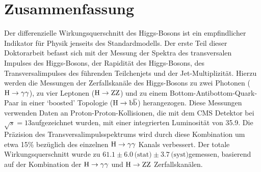 \section*{Zusammenfassung}


% 
Der differenzielle Wirkungsquerschnitt des Higgs-Bosons ist ein 
empfindlicher Indikator f{\"u}r Physik jenseits des Standardmodells.
% 
% 
% 
Der erste Teil dieser Doktorarbeit befasst sich mit der Messung der Spektra des 
transversalen Impulses des Higgs-Bosons, der 
Rapidit{\"a}t des Higgs-Bosons, des Transversalimpulses des f{\"u}hrenden 
Teilchenjets und der Jet-Multiplizit{\"a}t.
% 
Hierzu werden die 
Messungen der Zerfallskan{\"a}le des Higgs-Bosons zu zwei Photonen ($\mathrm{H}\to\mathrm{\gamma}\mathrm{\gamma}$), zu vier 
Leptonen ($\mathrm{H}\to\mathrm{Z}\mathrm{Z}$) und zu einem Bottom-Antibottom-Quark-Paar in einer `boosted' 
Topologie ($\mathrm{H}\to\mathrm{b}\overline{\mathrm{b}}$) herangezogen. %
% 
% 
Diese Messungen verwenden Daten an Proton-Proton-Kollisionen, die mit 
dem CMS Detektor bei $\sqrt{s}=13$\TeV aufgezeichnet wurden, mit einer 
integrierten Luminosit{\"a}t von 35.9\fbinv.
% 
% 
Die Pr{\"a}zision des Transversalimpulsspektrums wird durch diese 
Kombination um etwa 15\% bez{\"u}glich des einzelnen $\mathrm{H}\to\mathrm{\gamma}\mathrm{\gamma}$ Kanals verbessert.
% 
% 
Der totale Wirkungsquerschnitt wurde zu $61.1   \pm 6.0 \,\text{(stat)} \pm 3.7 \,\text{(syst)}$\pb gemessen, basierend auf der Kombination der $\mathrm{H}\to\mathrm{\gamma}\mathrm{\gamma}$ und $\mathrm{H}\to\mathrm{Z}\mathrm{Z}$ Zerfallskan{\"a}len.


